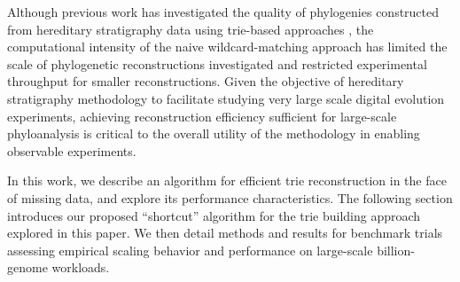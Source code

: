 Although previous work has investigated the quality of phylogenies constructed from hereditary stratigraphy data using trie-based approaches \citep{moreno2025testing}, the computational intensity of the naive wildcard-matching approach has limited the scale of phylogenetic reconstructions investigated and restricted experimental throughput for smaller reconstructions.
Given the objective of hereditary stratigraphy methodology to facilitate studying very large scale digital evolution experiments, achieving reconstruction efficiency sufficient for large-scale phyloanalysis is critical to the overall utility of the methodology in enabling observable experiments.

In this work, we describe an algorithm for efficient trie reconstruction in the face of missing data, and explore its performance characteristics.
The following section introduces our proposed ``shortcut'' algorithm for the trie building approach explored in this paper.
We then detail methods and results for benchmark trials assessing empirical scaling behavior and performance on large-scale billion-genome workloads.

%






